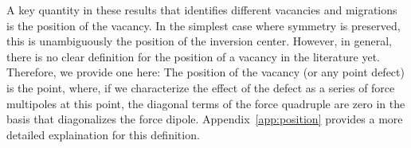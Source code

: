 \documentclass[%
 reprint,
 amsmath,amssymb,
 aps,
]{revtex4-1}
\begin{document}
A key quantity in these results that identifies different vacancies and migrations is the position of the vacancy.
In the simplest case where symmetry is preserved, this is unambiguously the position of the inversion center.
However, in general, there is no clear definition for the position of a vacancy in the literature yet.
Therefore, we provide one here:
The position of the vacancy (or any point defect) is the point, where, if we characterize the effect of the defect as a series of force multipoles at this point, the diagonal terms of the force quadruple are zero in the basis that diagonalizes the force dipole.
Appendix~\ref{app:position} provides a more detailed explaination for this definition.

\end{document}
